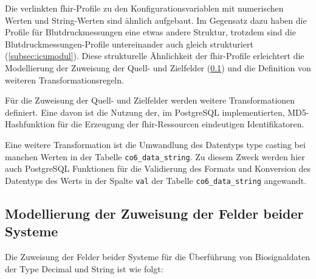 Die verlinkten \ac{fhir}-Profile zu den Konfigurationsvariablen mit numerischen Werten und String-Werten sind ähnlich aufgebaut. Im Gegensatz dazu haben die Profile für Blutdruckmessungen eine etwas andere Struktur, trotzdem sind die Blutdruckmessungen-Profile untereinander auch gleich strukturiert (\ref{subsec:icumodul}). Diese strukturelle Ähnlichkeit der \ac{fhir}-Profile erleichtert die Modellierung der Zuweisung der Quell- und Zielfelder (\ref{subsec:modellinksystems}) und die Definition von weiteren Transformationsregeln.

Für die Zuweisung der Quell- und Zielfelder werden weitere Transformationen definiert. Eine davon ist die Nutzung der, im PostgreSQL implementierten, MD5-Hashfunktion für die Erzeugung der \ac{fhir}-Ressourcen eindeutigen Identifikatoren. 

Eine weitere Transformation ist die Umwandlung des Datentyps \glqq type casting\grqq{} bei manchen Werten in der Tabelle \texttt{co6\_data\_string}. Zu diesem Zweck werden hier auch PostgreSQL Funktionen für die Validierung des Formats und Konversion des Datentyps des Werts in der Spalte \texttt{val} der Tabelle \texttt{co6\_data\_string} angewandt.

\subsection{Modellierung der Zuweisung der Felder beider Systeme} \label{subsec:modellinksystems}

Die Zuweisung der Felder beider Systeme für die Überführung von Biosignaldaten der Type \glqq Decimal\grqq{} und \glqq String\grqq{} ist wie folgt:
\vspace{4mm}

